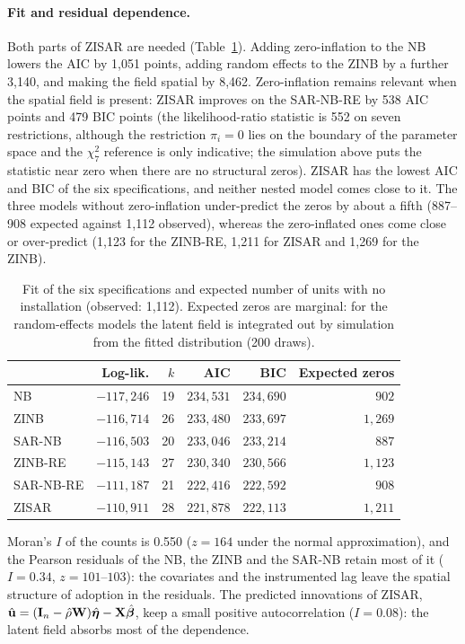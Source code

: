 \paragraph{Fit and residual dependence.}
Both parts of ZISAR are needed (Table~\ref{tab:solar_fit}).
Adding zero-inflation to the NB lowers the AIC by 1{,}051 points, adding random effects to the ZINB by a further 3{,}140, and making the field spatial by 8{,}462.
Zero-inflation remains relevant when the spatial field is present: ZISAR improves on the SAR-NB-RE by 538 AIC points and 479 BIC points (the likelihood-ratio statistic is 552 on seven restrictions, although the restriction $\pi_i = 0$ lies on the boundary of the parameter space and the $\chi^2_7$ reference is only indicative; the simulation above puts the statistic near zero when there are no structural zeros).
ZISAR has the lowest AIC and BIC of the six specifications, and neither nested model comes close to it.
The three models without zero-inflation under-predict the zeros by about a fifth (887--908 expected against 1{,}112 observed), whereas the zero-inflated ones come close or over-predict (1{,}123 for the ZINB-RE, 1{,}211 for ZISAR and 1{,}269 for the ZINB).

\begin{table}[htbp]
\centering
\caption{Fit of the six specifications and expected number of units with no installation (observed: 1{,}112). Expected zeros are marginal: for the random-effects models the latent field is integrated out by simulation from the fitted distribution (200 draws).}\label{tab:solar_fit}
\small
\begin{tabular}{lrrrrr}
\toprule
 & Log-lik. & $k$ & AIC & BIC & Expected zeros \\
\midrule
NB        & $-117{,}246$ & 19 & $234{,}531$ & $234{,}690$ & $902$ \\
ZINB      & $-116{,}714$ & 26 & $233{,}480$ & $233{,}697$ & $1{,}269$ \\
SAR-NB    & $-116{,}503$ & 20 & $233{,}046$ & $233{,}214$ & $887$ \\
ZINB-RE   & $-115{,}143$ & 27 & $230{,}340$ & $230{,}566$ & $1{,}123$ \\
SAR-NB-RE & $-111{,}187$ & 21 & $222{,}416$ & $222{,}592$ & $908$ \\
ZISAR     & $-110{,}911$ & 28 & $221{,}878$ & $222{,}113$ & $1{,}211$ \\
\bottomrule
\end{tabular}
\end{table}

Moran's $I$ of the counts is 0.550 ($z = 164$ under the normal approximation), and the Pearson residuals of the NB, the ZINB and the SAR-NB retain most of it ($I = 0.34$, $z = 101$--$103$): the covariates and the instrumented lag leave the spatial structure of adoption in the residuals.
The predicted innovations of ZISAR, $\hat{\mathbf{u}} = (\mathbf{I}_n-\hat\rho\mathbf{W})\hat{\boldsymbol\eta} - \mathbf{X}\hat{\boldsymbol{\beta}}$, keep a small positive autocorrelation ($I = 0.08$): the latent field absorbs most of the dependence.

